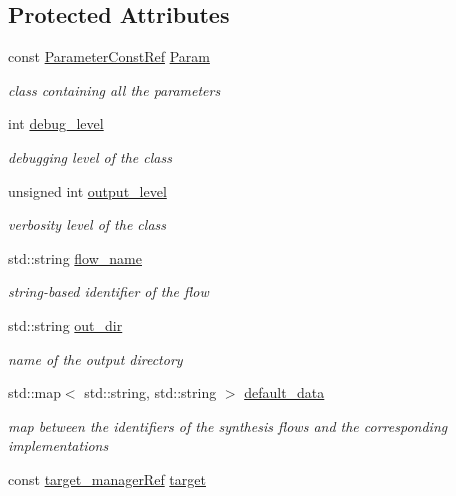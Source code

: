 \subsection*{Protected Attributes}
\begin{DoxyCompactItemize}
\item 
const \hyperlink{Parameter_8hpp_a37841774a6fcb479b597fdf8955eb4ea}{Parameter\+Const\+Ref} \hyperlink{classBackendFlow_a7d21e7cf0afc64b13e0009c9e351873d}{Param}
\begin{DoxyCompactList}\small\item\em class containing all the parameters \end{DoxyCompactList}\item 
int \hyperlink{classBackendFlow_a51ab7bc0bb6080e902f55aeee1f04006}{debug\+\_\+level}
\begin{DoxyCompactList}\small\item\em debugging level of the class \end{DoxyCompactList}\item 
unsigned int \hyperlink{classBackendFlow_aea3f2a1a3b65e199fe9a1752c1fd68b9}{output\+\_\+level}
\begin{DoxyCompactList}\small\item\em verbosity level of the class \end{DoxyCompactList}\item 
std\+::string \hyperlink{classBackendFlow_acb230ccab7e32cf0a88811097ff8c3f8}{flow\+\_\+name}
\begin{DoxyCompactList}\small\item\em string-\/based identifier of the flow \end{DoxyCompactList}\item 
std\+::string \hyperlink{classBackendFlow_a109494ad00f75999dcf16fd6e346a224}{out\+\_\+dir}
\begin{DoxyCompactList}\small\item\em name of the output directory \end{DoxyCompactList}\item 
std\+::map$<$ std\+::string, std\+::string $>$ \hyperlink{classBackendFlow_a39361aab80b7b193ed3c38122a8651cf}{default\+\_\+data}
\begin{DoxyCompactList}\small\item\em map between the identifiers of the synthesis flows and the corresponding implementations \end{DoxyCompactList}\item 
const \hyperlink{target__manager_8hpp_aee0b586a84fb6eb4faefa6e41e1735a9}{target\+\_\+manager\+Ref} \hyperlink{classBackendFlow_a693ab6eaf29b1836eb91dcd92eb0189f}{target}

\end{DoxyCompactItemize}

